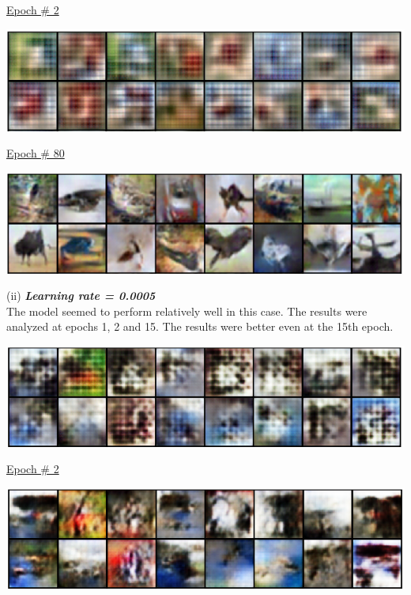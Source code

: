 \documentclass{exam}
\begin{document}
\underline{Epoch \# 2}
\begin{center}
	\includegraphics[scale=0.7]{../assets/model-1-2}
\end{center}


\underline{Epoch \# 80}
\begin{center}
	\includegraphics[scale=0.7]{../assets/model-1-3}
\end{center}

\pagebreak

(ii) \textbf{\textit{Learning rate = 0.0005}}\\

The model seemed to perform relatively well in this case. The results were analyzed at epochs 1, 2 and 15. The results were better even at the 15th epoch.
\begin{center}
	\includegraphics[scale=0.7]{../assets/model-2-1}
\end{center}

\underline{Epoch \# 2}
\begin{center}
	\includegraphics[scale=0.7]{../assets/model-2-2}
\end{center}
\end{document}
